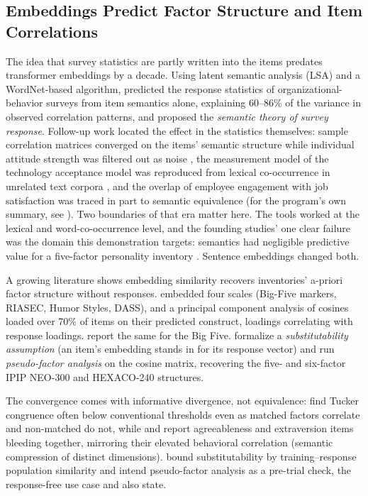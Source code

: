 \subsection{Embeddings Predict Factor Structure and Item Correlations}

The idea that survey statistics are partly written into the items predates
transformer embeddings by a decade. Using latent semantic analysis (LSA) and a
WordNet-based algorithm, \citet{arnulf-etal-2014} predicted the response
statistics of organizational-behavior surveys from item semantics alone,
explaining 60--86\% of the variance in observed correlation patterns, and
proposed the \emph{semantic theory of survey response}. Follow-up work located
the effect in the statistics themselves: sample correlation matrices converged
on the items' semantic structure while individual attitude strength was
filtered out as noise \citep{arnulf-etal-2018}, the measurement model of the
technology acceptance model was reproduced from lexical co-occurrence in
unrelated text corpora \citep{gefen-larsen-2017}, and the overlap of employee
engagement with job satisfaction was traced in part to semantic equivalence
\citep{nimon-etal-2016} (for the program's own summary, see
\citealp{arnulf-etal-2021}). Two boundaries of that era matter here. The tools
worked at the lexical and word-co-occurrence level, and the founding studies'
one clear failure was the domain this demonstration targets: semantics had
negligible predictive value for a five-factor personality inventory
\citep{arnulf-etal-2014, arnulf-etal-2018}. Sentence embeddings changed both.

A growing literature shows embedding similarity recovers inventories' a-priori
factor structure without responses. \citet{milano-etal-2025a} embedded four scales
(Big-Five markers, RIASEC, Humor Styles, DASS), and a principal component analysis
of cosines loaded over 70\% of items on their predicted construct, loadings
correlating with response loadings. \citet{casella-etal-2024} report the same for
the Big Five. \citet{guenole-etal-2025} formalize a \emph{substitutability
assumption} (an item's embedding stands in for its response vector) and run
\emph{pseudo-factor analysis} on the cosine matrix, recovering the five- and
six-factor IPIP NEO-300 and HEXACO-240 structures.

The convergence comes with informative divergence, not equivalence:
\citet{guenole-etal-2025} find Tucker congruence often below conventional
thresholds even as matched factors correlate and non-matched do not, while
\citet{milano-etal-2025a} and \citet{casella-etal-2024} report agreeableness and
extraversion items bleeding together, mirroring their elevated behavioral
correlation (semantic compression of distinct dimensions). \citet{guenole-etal-2025}
bound substitutability by training--response population similarity and intend
pseudo-factor analysis as a pre-trial check, the response-free use case
\citet{milano-etal-2025a} and \citet{milano-etal-2025b} also state.

